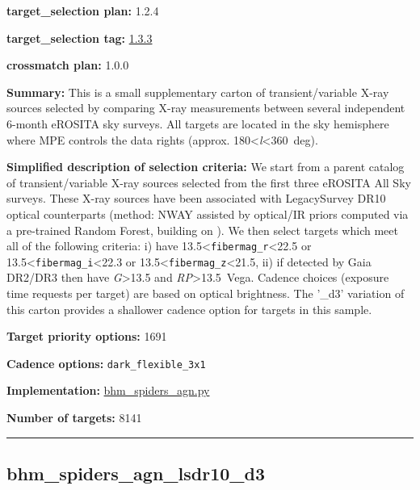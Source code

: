 \noindent\textbf{target\_selection plan:} 1.2.4

\noindent\textbf{target\_selection tag:}
\href{https://github.com/sdss/target_selection/tree/1.3.3/}{1.3.3}

\noindent\textbf{crossmatch plan:} 1.0.0

\noindent\textbf{Summary:} This is a small supplementary carton of
transient/variable X-ray sources selected by comparing X-ray
measurements between several independent 6-month eROSITA sky surveys.
All targets are located in the sky hemisphere where MPE controls the
data rights (approx. 180\textless{}\emph{l}\textless360~deg).

\noindent\textbf{Simplified description of selection criteria:} We start from a
parent catalog of transient/variable X-ray sources selected from the
first three eROSITA All Sky surveys. These X-ray sources have been
associated with LegacySurvey DR10 optical counterparts (method: NWAY
assisted by optical/IR priors computed via a pre-trained Random Forest,
building on
\citealt{Salvato2022}). We then select targets which meet all of the following
criteria: i) have 13.5\textless{}\texttt{fibermag\_r}\textless22.5 or
13.5\textless{}\texttt{fibermag\_i}\textless22.3 or
13.5\textless{}\texttt{fibermag\_z}\textless21.5, ii) if detected by
Gaia DR2/DR3 then have \emph{G}\textgreater13.5 and
\emph{RP}\textgreater13.5~Vega. Cadence choices (exposure time requests
per target) are based on optical brightness. The '\_d3' variation of
this carton provides a shallower cadence option for targets in this
sample.


\noindent\textbf{Target priority options:} 1691

\noindent\textbf{Cadence options:} \texttt{dark\_flexible\_3x1}

\noindent\textbf{Implementation:}
\href{https://github.com/sdss/target_selection/blob/1.3.3/python/target_selection/cartons/bhm_spiders_agn.py}{bhm\_spiders\_agn.py}

\noindent\textbf{Number of targets:} 8141

\begin{center}\rule{0.5\linewidth}{0.5pt}\end{center}

\hypertarget{bhm_spiders_agn_lsdr10_d3_plan1.2.4}{%
\subsection{bhm\_spiders\_agn\_lsdr10\_d3}\label{bhm_spiders_agn_lsdr10_d3_plan1.2.4}}


